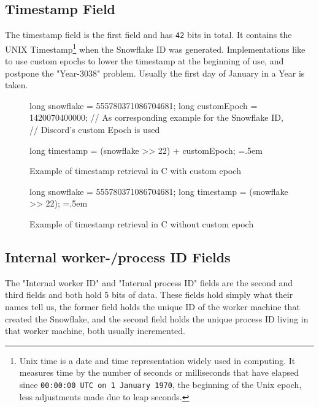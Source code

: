 \documentclass{article}
\newcommand{\code}[1]{\colorbox{cverbbg}{\texttt{#1}}}
\newcommand{\hn}[0]{\hfill \newline}
\newenvironment{lcverbatim}
 {\SaveVerbatim{cverb}}
 {\endSaveVerbatim
  \flushleft\fboxrule=0pt\fboxsep=.5em
  \colorbox{cverbbg}{%
    \makebox[\dimexpr\linewidth-2\fboxsep][l]{\BUseVerbatim{cverb}}%
  }
  \endflushleft
}
\begin{document}
\subsection{Timestamp Field}
The timestamp field is the first field and has \code{42} bits in total. It contains the UNIX Timestamp\footnote{Unix time is a date and time representation widely used in computing. It measures time by the number of seconds or milliseconds that have elapsed since \texttt{00:00:00 UTC on 1 January 1970}, the beginning of the Unix epoch, less adjustments made due to leap seconds.} when the Snowflake ID was generated. Implementations like to use custom epochs to lower the timestamp at the beginning of use, and postpone the "Year-3038" problem. Usually the first day of January in a Year is taken.

\begin{figure}[H]
    \begin{lcverbatim}
    long snowflake = 555780371086704681;
    long customEpoch = 1420070400000;
    // As corresponding example for the Snowflake ID,
    // Discord's custom Epoch is used
    
    long timestamp = (snowflake >> 22) + customEpoch;
    \end{lcverbatim}
    \caption{Example of timestamp retrieval in C with custom epoch}
    \label{fig:r_timestamp_1}
\end{figure}

\begin{figure}[H]
    \begin{lcverbatim}
    long snowflake = 555780371086704681;
    long timestamp = (snowflake >> 22);
    \end{lcverbatim}
    \caption{Example of timestamp retrieval in C without custom epoch}
    \label{fig:r_timestamp_2}
\end{figure}


\subsection{Internal worker-/process ID Fields}
The "Internal worker ID" and "Internal process ID" fields are the second and third fields and both hold 5 bits of data. \newline
\hn
These fields hold simply what their names tell us, the former field holds the unique ID of the worker machine that created the Snowflake, and the second field holds the unique process ID living in that worker machine, both usually incremented. \newline
\end{document}
